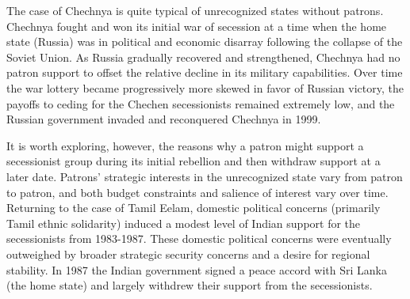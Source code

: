\documentclass[11pt,letterpaper, notitlepage]{article}
\begin{document}

The case of Chechnya is quite typical of unrecognized states without patrons. Chechnya fought and won its initial war of secession at a time when the home state (Russia) was in political and economic disarray following the collapse of the Soviet Union. As Russia gradually recovered and strengthened, Chechnya had no patron support to offset the relative decline in its military capabilities. Over time the war lottery became progressively more skewed in favor of Russian victory, the payoffs to ceding for the Chechen secessionists remained extremely low, and the Russian government invaded and reconquered Chechnya in 1999.

It is worth exploring, however, the reasons why a patron might support a secessionist group during its initial rebellion and then withdraw support at a later date. Patrons' strategic interests in the unrecognized state vary from patron to patron, and both budget constraints and salience of interest vary over time. Returning to the case of Tamil Eelam, domestic political concerns (primarily Tamil ethnic solidarity) induced a modest level of Indian support for the secessionists  from 1983-1987. These domestic political concerns were eventually outweighed by broader strategic security concerns and a desire for regional stability. In 1987 the Indian government signed a peace accord with Sri Lanka (the home state) and largely withdrew their support from the secessionists.

\end{document}
